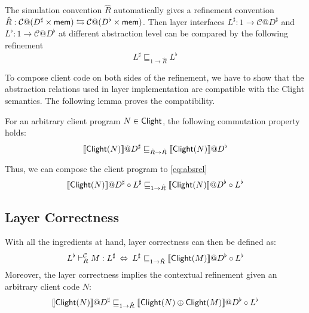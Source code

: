 \documentclass[acmsmall,review,anonymous]{acmart}\settopmatter{printfolios=true,printccs=false,printacmref=false}
\begin{document}
The simulation convention $\hat{R}$
automatically gives a refinement convention
$\hat{R}: \mathcal{C}@(D^\sharp \times  \mathsf{mem} )
\leftrightarrows \mathcal{C}@(D^\flat \times  \mathsf{mem} )$.
Then layer interfaces
$L^\sharp: 1 \rightarrow \mathcal{C}@D^\sharp$
and $L^\flat: 1 \rightarrow \mathcal{C}@D^\flat$
at different abstraction level
can be compared
by the following refinement
\begin{equation}
  \label{eq:absrel}
  L^\sharp \sqsubseteq_{1 \rightarrow \hat{R}} L^\flat
\end{equation}

To compose client code on both sides of the refinement,
we have to show that
the abstraction relations
used in layer implementation are
compatible with the Clight semantics.
The following lemma proves the compatibility.

\begin{lemma}

For an arbitrary client program $N \in  \mathsf{Clight} $,
the following commutation property holds:
\[
  \llbracket  \mathsf{Clight} (N) \rrbracket @D^\sharp
  \sqsubseteq_{\hat{R} \rightarrow \hat{R}}
  \llbracket  \mathsf{Clight} (N) \rrbracket @D^\flat
\]
\end{lemma}
Thus, we can compose the client program
to \autoref{eq:absrel}
\[
  \llbracket  \mathsf{Clight} (N) \rrbracket @D^\sharp
  \circ L^\sharp
  \sqsubseteq_{1 \rightarrow \hat{R}}
  \llbracket  \mathsf{Clight} (N) \rrbracket @D^\flat
  \circ L^\flat
\]


\subsection{Layer Correctness} %
\label{sec:ccal:correctness}

With all the ingredients at hand,
layer correctness can then be defined as:
\[
  L^\flat \vdash_R^\mathcal{C} M : L^\sharp
  \:\Leftrightarrow\:
  L^\sharp \sqsubseteq_{1 \rightarrow \hat{R}}
  \llbracket  \mathsf{Clight} (M) \rrbracket
  @D^\flat \circ L^\flat
\]
Moreover, the layer correctness implies
the contextual refinement given an arbitrary client code $N$:
\[
  \llbracket  \mathsf{Clight} (N) \rrbracket @ D^\sharp
  \sqsubseteq_{1 \rightarrow \hat{R}}
  \llbracket  \mathsf{Clight} (N) \oplus  \mathsf{Clight} (M) \rrbracket
  @D^\flat \circ L^\flat
\]
\end{document}

